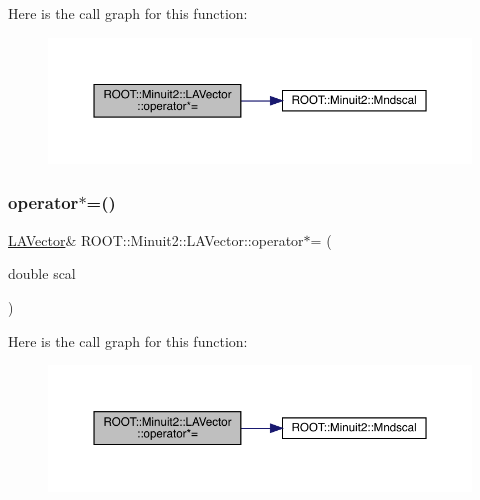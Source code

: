 Here is the call graph for this function\+:
\nopagebreak
\begin{figure}[H]
\begin{center}
\leavevmode
\includegraphics[width=350pt]{d3/d20/classROOT_1_1Minuit2_1_1LAVector_a3acb9399e2b908c080e83ccd878eb349_cgraph}
\end{center}
\end{figure}
\mbox{\label{classROOT_1_1Minuit2_1_1LAVector_a3acb9399e2b908c080e83ccd878eb349}} 
\subsubsection{\texorpdfstring{operator$\ast$=()}{operator*=()}\hspace{0.1cm}{\footnotesize\ttfamily [3/3]}}
{\footnotesize\ttfamily \mbox{\hyperlink{classROOT_1_1Minuit2_1_1LAVector}{L\+A\+Vector}}\& R\+O\+O\+T\+::\+Minuit2\+::\+L\+A\+Vector\+::operator$\ast$= (\begin{DoxyParamCaption}\item[{double}]{scal }\end{DoxyParamCaption})\hspace{0.3cm}{\ttfamily [inline]}}

Here is the call graph for this function\+:
\nopagebreak
\begin{figure}[H]
\begin{center}
\leavevmode
\includegraphics[width=350pt]{d3/d20/classROOT_1_1Minuit2_1_1LAVector_a3acb9399e2b908c080e83ccd878eb349_cgraph}
\end{center}
\end{figure}
\mbox{\label{classROOT_1_1Minuit2_1_1LAVector_ae560b2a352c80542c2333a68bc9c3b68}} 
